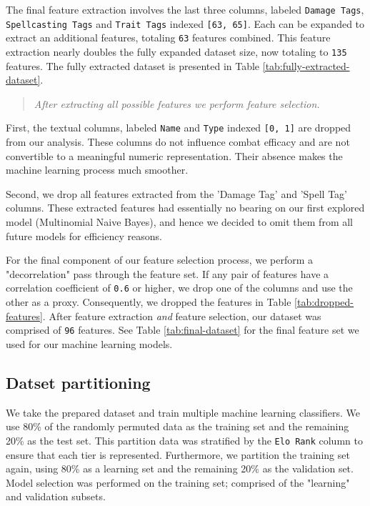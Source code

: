 \documentclass[12pt]{diazessay}
\begin{document}
The final feature extraction involves the last three columns, labeled
\texttt{Damage\ Tags}, \texttt{Spellcasting\ Tags} and
\texttt{Trait\ Tags} indexed \texttt{{[}63,\ 65{]}}. Each can be
expanded to extract an additional features, totaling \texttt{63}
features combined. This feature extraction nearly doubles the fully
expanded dataset size, now totaling to \texttt{135} features.
The fully extracted dataset is presented in Table \ref{tab:fully-extracted-dataset}.

\begin{quote}
{\itshape After extracting all possible features we perform feature selection.}
\end{quote}

First, the textual columns, labeled
\texttt{\textquotesingle{}Name\textquotesingle{}} and
\texttt{\textquotesingle{}Type\textquotesingle{}} indexed
\texttt{{[}0,\ 1{]}} are dropped from our analysis. These columns do not
influence combat efficacy and are not convertible to a meaningful
numeric representation. Their absence makes the machine learning process
much smoother.

Second, we drop all features extracted from the 'Damage Tag' and 'Spell
Tag' columns. These extracted features had essentially no bearing on our
first explored model (Multinomial Naive Bayes), and hence we decided to
omit them from all future models for efficiency reasons.

For the final component of our feature selection process, we perform a "decorrelation" pass through the feature set.
If any pair of features have a correlation coefficient of \texttt{0.6} or higher, we drop one of the columns and use the other as a proxy.
Consequently, we dropped the
features in Table \ref{tab:dropped-features}.
After feature extraction \emph{and} feature selection, our dataset was comprised of \texttt{96} features.
See Table \ref{tab:final-dataset} for the final feature set we used for our machine learning models.


\hypertarget{datset-partitioning}{%
\subsection{Datset partitioning}\label{datset-partitioning}}

We take the prepared dataset and train multiple machine learning
classifiers. We use 80\% of the randomly permuted data as the training
set and the remaining 20\% as the test set. This partition data was
stratified by the \texttt{\textquotesingle{}Elo\ Rank\textquotesingle{}}
column to ensure that each tier is represented. Furthermore, we
partition the training set again, using 80\% as a learning set and the
remaining 20\% as the validation set. Model selection was performed on
the training set; comprised of the "learning" and validation subsets.
\end{document}
